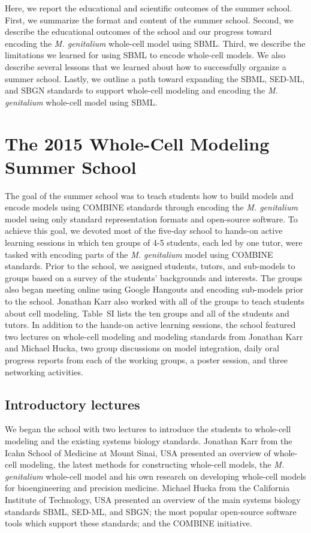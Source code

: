 \documentclass[journal,transmag]{IEEEtran}
\begin{document}
Here, we report the educational and scientific outcomes of the summer school. 
First, we summarize the format and content of the summer school. 
Second, we describe the educational outcomes of the school and our progress toward encoding the \textit{M. genitalium} whole-cell model using SBML. 
Third, we describe the limitations we learned for using SBML to encode whole-cell models. We also describe several lessons that we learned about how to successfully organize a summer school. 
Lastly, we outline a path toward expanding the SBML, SED-ML, and SBGN standards to support whole-cell modeling and encoding the \textit{M. genitalium} whole-cell model using SBML.

\section{The 2015 Whole-Cell Modeling Summer School}
The goal of the summer school was to teach students how to build models and encode models using COMBINE standards through encoding the \textit{M. genitalium} model using only standard representation formats and open-source software. 
To achieve this goal, we devoted most of the five-day school to hands-on active learning sessions in which ten groups of 4-5 students, each led by one tutor, were tasked with encoding parts of the \textit{M. genitalium} model using COMBINE standards. 
Prior to the school, we assigned students, tutors, and sub-models to groups based on a survey of the students' backgrounds and interests. 
The groups also began meeting online using Google Hangouts and encoding sub-models prior to the school. 
Jonathan Karr also worked with all of the groups to teach students about cell modeling. 
Table~SI lists the ten groups and all of the students and tutors. 
In addition to the hands-on active learning sessions, the school featured two lectures on whole-cell modeling and modeling standards from Jonathan Karr and Michael Hucka, two group discussions on model integration, daily oral progress reports from each of the working groups, a poster session, and three networking activities.

\subsection{Introductory lectures}
We began the school with two lectures to introduce the students to whole-cell modeling and the existing systems biology standards. Jonathan Karr from the Icahn School of Medicine at Mount Sinai, USA presented an overview of whole-cell modeling, the latest methods for constructing whole-cell models, the \textit{M. genitalium} whole-cell model and his own research on developing whole-cell models for bioengineering and precision medicine. Michael Hucka from the California Institute of Technology, USA presented an overview of the main systems biology standards SBML, SED-ML, and SBGN; the most popular open-source software tools which support these standards; and the COMBINE initiative.
\end{document}
